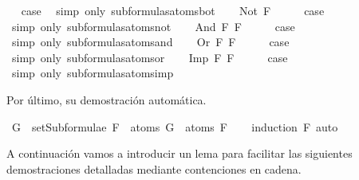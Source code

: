 \begin{isabellebody}
\ \isamarkupfalse%
\ {\isacharquery}case\ \isamarkupfalse%
\ {\isacharparenleft}simp\ only{\isacharcolon}\ subformulas{\isacharunderscore}atoms{\isacharunderscore}bot{\isacharparenright}\isanewline
{}\isamarkupfalse%
\isanewline
\ \ \isamarkupfalse%
\ {\isacharparenleft}Not\ F{\isacharparenright}\isanewline
\ \ \isamarkupfalse%
\ \isamarkupfalse%
\ {\isacharquery}case\ \isamarkupfalse%
\ {\isacharparenleft}simp\ only{\isacharcolon}\ subformulas{\isacharunderscore}atoms{\isacharunderscore}not{\isacharparenright}\isanewline
{}\isamarkupfalse%
\isanewline
\ \ \isamarkupfalse%
\ {\isacharparenleft}And\ F{}\ F{}{\isacharparenright}\isanewline
\ \ \isamarkupfalse%
\ \isamarkupfalse%
\ {\isacharquery}case\ \isamarkupfalse%
\ {\isacharparenleft}simp\ only{\isacharcolon}\ subformulas{\isacharunderscore}atoms{\isacharunderscore}and{\isacharparenright}\isanewline
{}\isamarkupfalse%
\isanewline
\ \ \isamarkupfalse%
\ {\isacharparenleft}Or\ F{}\ F{}{\isacharparenright}\isanewline
\ \ \isamarkupfalse%
\ \isamarkupfalse%
\ {\isacharquery}case\ \isamarkupfalse%
\ {\isacharparenleft}simp\ only{\isacharcolon}\ subformulas{\isacharunderscore}atoms{\isacharunderscore}or{\isacharparenright}\isanewline
{}\isamarkupfalse%
\isanewline
\ \ \isamarkupfalse%
\ {\isacharparenleft}Imp\ F{}\ F{}{\isacharparenright}\isanewline
\ \ \isamarkupfalse%
\ \isamarkupfalse%
\ {\isacharquery}case\ \isamarkupfalse%
\ {\isacharparenleft}simp\ only{\isacharcolon}\ subformulas{\isacharunderscore}atoms{\isacharunderscore}imp{\isacharparenright}\isanewline
{}\isamarkupfalse%
%
\endisatagproof
{\isafoldproof}%
%
\isadelimproof
%
\endisadelimproof
%
\begin{isamarkuptext}%
Por último, su demostración automática.%
\end{isamarkuptext}\isamarkuptrue%
\isamarkupfalse%
\ {\isachardoublequoteopen}G\ {\isasymin}\ setSubformulae\ F\ {\isasymLongrightarrow}\ atoms\ G\ {\isasymsubseteq}\ atoms\ F{\isachardoublequoteclose}\isanewline
%
\isadelimproof
\ \ %
\endisadelimproof
%
\isatagproof
{}\isamarkupfalse%
\ {\isacharparenleft}induction\ F{\isacharparenright}\ auto%
\endisatagproof
{\isafoldproof}%
%
\isadelimproof
%
\endisadelimproof
%
\begin{isamarkuptext}%
A continuación vamos a introducir un lema para facilitar
   las siguientes demostraciones detalladas mediante contenciones en 
   cadena.


\end{isamarkuptext}
\end{isabellebody}
